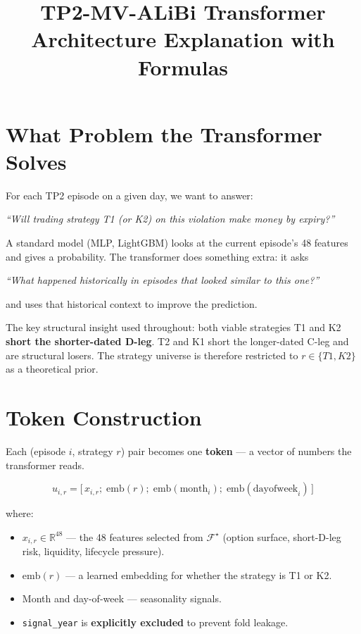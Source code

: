 \documentclass[11pt]{article}
\title{\textbf{TP2-MV-ALiBi Transformer}\\[4pt]
\large Architecture Explanation with Formulas}
\author{}
\date{}
\newcommand{\R}{\mathbb{R}}
\newcommand{\1}{\mathbf{1}}
\begin{document}
\maketitle
\tableofcontents
\newpage

\section{What Problem the Transformer Solves}

For each TP2 episode on a given day, we want to answer:

\begin{center}
\textit{``Will trading strategy T1 (or K2) on this violation make money by expiry?''}
\end{center}

A standard model (MLP, LightGBM) looks at the current episode's 48 features and
gives a probability. The transformer does something extra: it asks

\begin{center}
\textit{``What happened historically in episodes that looked similar to this one?''}
\end{center}

and uses that historical context to improve the prediction.

The key structural insight used throughout: both viable strategies T1 and K2
\textbf{short the shorter-dated D-leg}. T2 and K1 short the longer-dated C-leg
and are structural losers. The strategy universe is therefore restricted to
$r \in \{T1, K2\}$ as a theoretical prior.

\section{Token Construction}

Each (episode $i$, strategy $r$) pair becomes one \textbf{token} --- a vector
of numbers the transformer reads.

\[
  u_{i,r}
  =
  \bigl[\,
    x_{i,r};\;
    \mathrm{emb}(r);\;
    \mathrm{emb}(\mathrm{month}_i);\;
    \mathrm{emb}(\mathrm{dayofweek}_i)
  \,\bigr]
\]

where:
\begin{itemize}[leftmargin=*]
  \item $x_{i,r} \in \R^{48}$ --- the 48 features selected from $\mathcal{F}^\star$
        (option surface, short-D-leg risk, liquidity, lifecycle pressure).
  \item $\mathrm{emb}(r)$ --- a learned embedding for whether the strategy is T1 or K2.
  \item Month and day-of-week --- seasonality signals.
  \item \texttt{signal\_year} is \textbf{explicitly excluded} to prevent fold leakage.
\end{itemize}
\end{document}
